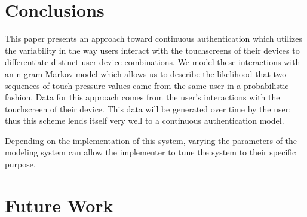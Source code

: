 \documentclass{acm_proc_article-sp}
\begin{document}
\section{Conclusions}
\label{sec:conclusions}
This paper presents an approach toward continuous authentication which utilizes the variability in the way users interact with the touchscreens of their devices to differentiate distinct user-device combinations. We model these interactions with an n-gram Markov model which allows us to describe the likelihood that two sequences of touch pressure values came from the same user in a probabilistic fashion. Data for this approach comes from the user's interactions with the touchscreen of their device. This data will be generated over time by the user; thus this scheme lends itself very well to a continuous authentication model.

Depending on the implementation of this system, varying the parameters of the modeling system can allow the implementer to tune the system to their specific purpose. 

\section{Future Work}
\label{sec:futurework}



\end{document}
